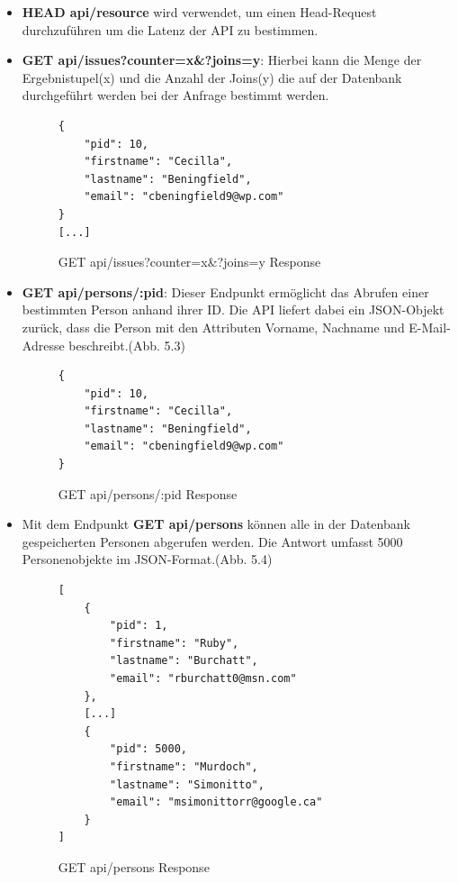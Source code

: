 \begin{itemize}
\item \textbf{HEAD api/resource} wird verwendet, um einen Head-Request durchzuführen um die Latenz der API zu bestimmen.
\item \textbf{GET api/issues?counter=x\&?joins=y}: Hierbei kann die Menge der Ergebnistupel(x) und die Anzahl der Joins(y) die auf der Datenbank durchgeführt werden bei der Anfrage bestimmt werden.
\begin{figure}[H]
\begin{center}
\begin{BVerbatim}
{
    "pid": 10,
    "firstname": "Cecilla",
    "lastname": "Beningfield",
    "email": "cbeningfield9@wp.com"
}
[...]
\end{BVerbatim}
\end{center}
\caption{GET api/issues?counter=x\&?joins=y Response}
\end{figure}


\item \textbf{GET api/persons/:pid}: Dieser Endpunkt ermöglicht das Abrufen einer bestimmten Person anhand ihrer ID. Die API liefert dabei ein JSON-Objekt zurück, dass die Person mit den Attributen Vorname, Nachname und E-Mail-Adresse beschreibt.(Abb. 5.3)
\begin{figure}[H]
\begin{center}
\begin{BVerbatim}
{
    "pid": 10,
    "firstname": "Cecilla",
    "lastname": "Beningfield",
    "email": "cbeningfield9@wp.com"
}
\end{BVerbatim}
\end{center}
\caption{GET api/persons/:pid Response}
\end{figure}

\item Mit dem Endpunkt  \textbf{GET api/persons} können alle in der Datenbank gespeicherten Personen abgerufen werden. Die Antwort umfasst 5000 Personenobjekte im JSON-Format.(Abb. 5.4)

\begin{figure}[H]
\begin{center}
\begin{BVerbatim}
[
    {
        "pid": 1,
        "firstname": "Ruby",
        "lastname": "Burchatt",
        "email": "rburchatt0@msn.com"
    },
	[...]
    {
        "pid": 5000,
        "firstname": "Murdoch",
        "lastname": "Simonitto",
        "email": "msimonittorr@google.ca"
    }
]
\end{BVerbatim}
\end{center}
\caption{GET api/persons Response}
\end{figure}


\end{itemize}
